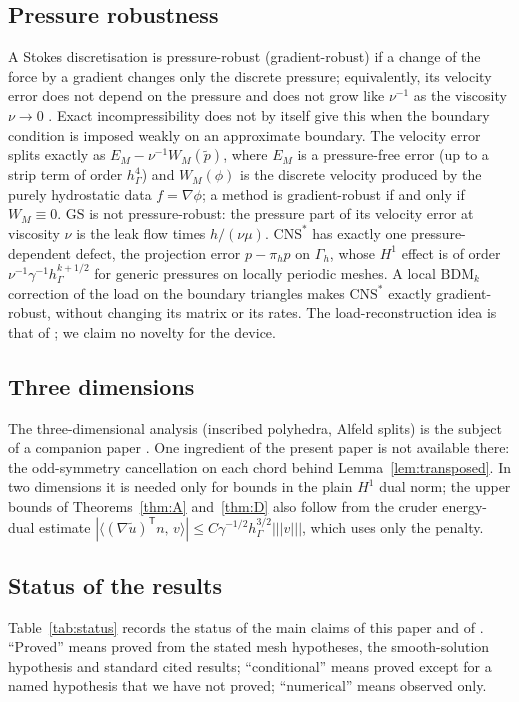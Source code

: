 \documentclass[pdflatex,sn-mathphys-num]{sn-jnl}
\theoremstyle{thmstyleone}
\theoremstyle{thmstylethree}
\newcommand{\hG}{h_\Gamma}
\newcommand{\Gh}{\Gamma_h}
\newcommand{\ut}{\tilde u}
\newcommand{\pt}{\tilde p}
\newcommand{\ip}[2]{\langle #1,\, #2\rangle}
\newcommand{\tnorm}[1]{|\!|\!|#1|\!|\!|}
\newcommand{\GS}{\mathrm{GS}}
\newcommand{\CNS}{\mathrm{CNS}^\ast}
\begin{document}
\subsection{Pressure robustness}
A Stokes discretisation is pressure-robust (gradient-robust) if a change of the force by a gradient changes only the discrete pressure; equivalently, its velocity error does not depend on the pressure and does not grow like $\nu^{-1}$ as the viscosity $\nu\to0$ \cite{JohnEtAl2017}. Exact incompressibility does not by itself give this when the boundary condition is imposed weakly on an approximate boundary. The velocity error splits exactly as $E_M-\nu^{-1}W_M(\pt)$, where $E_M$ is a pressure-free error (up to a strip term of order $\hG^4$) and $W_M(\phi)$ is the discrete velocity produced by the purely hydrostatic data $f=\nabla\phi$; a method is gradient-robust if and only if $W_M\equiv0$. $\GS$ is not pressure-robust: the pressure part of its velocity error at viscosity $\nu$ is the leak flow times $h/(\nu\mu)$. $\CNS$ has exactly one pressure-dependent defect, the projection error $p-\pi_hp$ on $\Gh$, whose $H^1$ effect is of order $\nu^{-1}\gamma^{-1}\hG^{k+1/2}$ for generic pressures on locally periodic meshes. A local $\mathrm{BDM}_k$ correction of the load on the boundary triangles makes $\CNS$ exactly gradient-robust, without changing its matrix or its rates. The load-reconstruction idea is that of \cite{JohnEtAl2017,NeilanOtus2021,ChenLiu2026}; we claim no novelty for the device.

\subsection{Three dimensions}
The three-dimensional analysis (inscribed polyhedra, Alfeld splits) is the subject of a companion paper \cite{PadhiThreeD}. One ingredient of the present paper is not available there: the odd-symmetry cancellation on each chord behind Lemma~\ref{lem:transposed}. In two dimensions it is needed only for bounds in the plain $H^1$ dual norm; the upper bounds of Theorems~\ref{thm:A} and~\ref{thm:D} also follow from the cruder energy-dual estimate $|\ip{(\nabla\ut)^{\mathsf T}n}{v}|\le C\gamma^{-1/2}\hG^{3/2}\tnorm v$, which uses only the penalty.

\subsection{Status of the results}
Table~\ref{tab:status} records the status of the main claims of this paper and of \cite{PadhiExt}. ``Proved'' means proved from the stated mesh hypotheses, the smooth-solution hypothesis and standard cited results; ``conditional'' means proved except for a named hypothesis that we have not proved; ``numerical'' means observed only.
\end{document}
